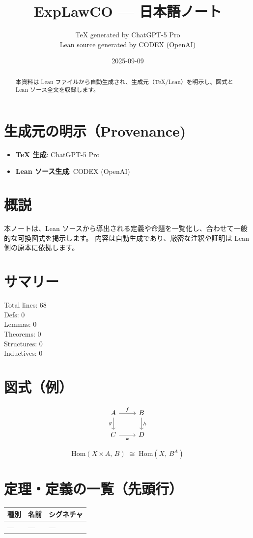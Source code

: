 \documentclass[12pt]{article}
\title{ExpLawCO — 日本語ノート}
\author{TeX generated by ChatGPT-5 Pro\\Lean source generated by CODEX (OpenAI)}
\date{2025-09-09}
\theoremstyle{definition}
\begin{document}
\maketitle

\begin{abstract}
本資料は Lean ファイルから自動生成され、生成元（TeX/Lean）を明示し、図式と Lean ソース全文を収録します。
\end{abstract}

\section*{生成元の明示（Provenance)}
\begin{itemize}
  \item \textbf{TeX 生成}: ChatGPT-5 Pro
  \item \textbf{Lean ソース生成}: CODEX (OpenAI)
\end{itemize}

\section*{概説}
本ノートは、Lean ソースから導出される定義や命題を一覧化し、合わせて一般的な可換図式を掲示します。
内容は自動生成であり、厳密な注釈や証明は Lean 側の原本に依拠します。

\section*{サマリー}
Total lines: 68\\
Defs: 0\\
Lemmas: 0\\
Theorems: 0\\
Structures: 0\\
Inductives: 0

\section*{図式（例）}

\[
\begin{tikzcd}
A \arrow[r, "f"] \arrow[d, "g"'] & B \arrow[d, "h"] \\
C \arrow[r, "k"'] & D
\end{tikzcd}
\]



\[
\mathrm{Hom}(X\times A,\,B) \;\cong\; \mathrm{Hom}(X,\,B^A)
\]


\section*{定理・定義の一覧（先頭行）}
\begin{center}
\begin{tabular}{lll}
\textbf{種別} & \textbf{名前} & \textbf{シグネチャ} \\ \hline
— & — & — \\
\end{tabular}
\end{center}
\end{document}
